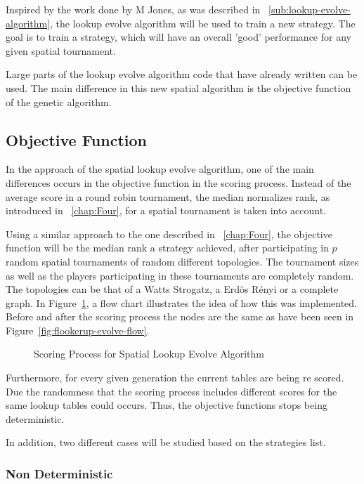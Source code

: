 Inspired by the work done by M Jones, as was described in ~\autoref{sub:lookup-evolve-algorithm},
the lookup evolve algorithm will be used to train a new strategy. The goal is to
train a strategy, which will have an overall 'good' performance for any given
spatial tournament.

Large parts of the lookup evolve algorithm code that have already written
can be used. The main difference in this new spatial algorithm is the objective
function of the genetic algorithm.
\subsection{Objective Function}

In the approach of the spatial lookup evolve algorithm, one of the main differences
occurs in the objective function in the scoring process. Instead of the average
score in a round robin tournament, the median normalizes rank, as introduced
in ~\autoref{chap:Four}, for a spatial tournament is taken into account.

Using a similar approach to the one described in ~\autoref{chap:Four}, the objective
function will be the median rank a strategy achieved, after participating in \(p\)
random spatial tournaments of random different topologies. The tournament sizes
as well as the players participating in these tournaments are completely random.
The topologies can be that of a Watts Strogatz, a Erd\"{o}s
R\'{e}nyi or a complete graph. In Figure~\ref{fig:objective}, a flow chart
illustrates the idea of how this was implemented. Before and after the scoring
process the nodes are the same as have been seen in Figure~\ref{fig:flookerup-evolve-flow}.

\begin{figure}[!hbtp]
		
		\caption{Scoring Process for Spatial Lookup Evolve Algorithm}
  \label{fig:objective}
\end{figure}


Furthermore, for every given generation the current tables are being re scored.
Due the randomness that the scoring process includes different scores for the
same lookup tables could occurs. Thus, the objective functions stops being
deterministic.

In addition, two different cases will be studied based on the strategies list.

\subsubsection{Non Deterministic}

